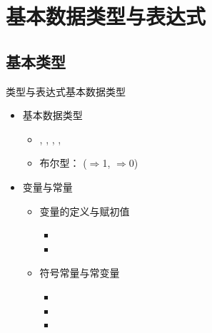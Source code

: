   

\section[类型与表达式]{基本数据类型与表达式}\label{sec:chap02-sec03}
\subsection[基本类型]{基本类型}
\begin{frame}[t, fragile]{类型与表达式}{基本数据类型}
  \stretchon
  \begin{itemize}
  \item 基本数据类型
    \begin{itemize}
    \item {}, , , , 
    \item 布尔型： ($\Rightarrow$1, $\Rightarrow$0)
    \end{itemize}
  \item 变量与常量
    \begin{itemize}
    \item 变量的定义与赋初值
      \begin{itemize}
      \item {}
      \item {}
      \end{itemize}
    \item 符号常量与常变量
      \begin{itemize}
      \item {}
      \item {}
      \item {}
      \end{itemize}
    \end{itemize}
  \end{itemize}
  \stretchoff
\end{frame}

